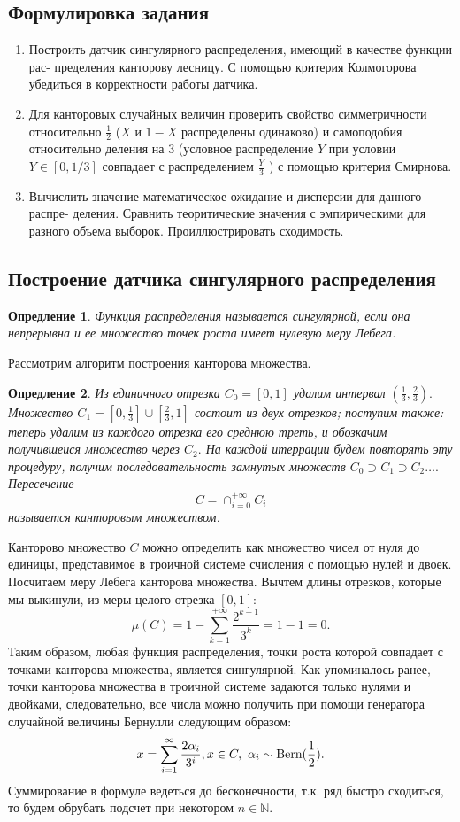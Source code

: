 \documentclass[11pt]{article}
\newtheorem{definition}{Опредление}
\newcommand{\bern}{\normalfont{\text{Bern}}}
\numberwithin{equation}{section}
\begin{document}
\subsection{Формулировка задания}
\begin{enumerate}
  \item Построить датчик сингулярного распределения, имеющий в качестве функции рас- пределения канторову лесницу. С помощью критерия Колмогорова убедиться в корректности работы датчика.
  \item Для канторовых случайных величин проверить свойство симметричности относительно $\frac{1}{2}$ ($X$ и $1−X$ распределены одинаково) и самоподобия относительно деления на 3 (условное распределение $Y$ при условии $Y \in [0, 1/3]$ совпадает с распределением $\frac{Y}{3}$ ) с помощью критерия Смирнова.
  \item Вычислить значение математическое ожидание и дисперсии для данного распре- деления. Сравнить теоритические значения с эмпирическими для разного объема выборок. Проиллюстрировать сходимость.
\end{enumerate}
\subsection{Построение датчика сингулярного распределения}
\begin{definition}
  Функция распределения называется сингулярной, если она непрерывна и ее множество точек роста имеет нулевую меру Лебега.
\end{definition}

Рассмотрим алгоритм построения канторова множества.
\begin{definition}
Из единичного отрезка $C_0=[0,1]$ удалим интервал $(\frac{1}{3},\frac{2}{3}).$ Множество $C_1 = [0, \frac{1}{3}] \cup [\frac{2}{3},1]$
состоит из двух отрезков; поступим также: теперь удалим из каждого отрезка его среднюю треть, и обозкачим получившеися множество через $C_2.$
На каждой итеррации будем повторять эту процедуру, получим последовательность замнутых множеств 
$C_0 \supset C_1 \supset C_2 \dots .$
Пересечение 
$$C = \cap_{i=0}^{+\infty} C_i$$
называется канторовым множеством.
\end{definition}

Канторово множество $C$ можно определить как множество чисел от нуля до единицы, представимое в троичной системе счисления с помощью нулей и двоек.
Посчитаем меру Лебега канторова множества. Вычтем длины отрезков, которые мы выкинули, из меры целого отрезка $[0,1]$:
$$ \mu(C) = 1 - \sum_{k=1}^{+\infty} \frac{2^{k-1}}{3^k}=1-1 = 0.$$
Таким образом, любая функция распределения, точки роста которой совпадает с точками канторова множества, является сингулярной. Как упоминалось ранее, точки канторова множества в троичной системе задаются только нулями и двойками, следовательно, все числа можно получить при помощи генератора случайной величины Бернулли следующим образом:
$$ x = \sum_{i=1}^{\infty}\frac{2\alpha_i}{3^i}, x \in C, \ \alpha_i \sim \bern(\frac{1}{2}).$$
Суммирование в формуле ведеться до бесконечности, т.к. ряд быстро сходиться, то будем обрубать подсчет при некотором $n \in \mathbb{N}.$
\end{document}
